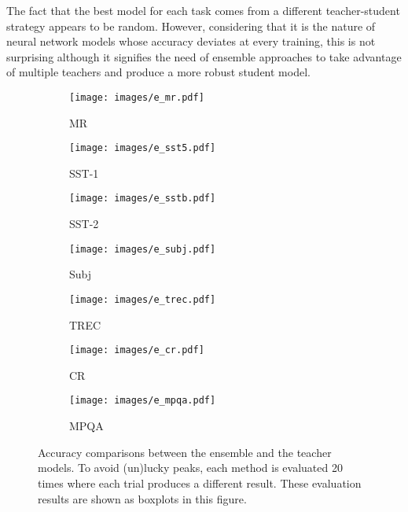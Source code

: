 \documentclass{article}
\begin{document}
The fact that the best model for each task comes from a different teacher-student strategy appears to be random.
However, considering that it is the nature of neural network models whose accuracy deviates at every training, this is not surprising although it signifies the need of ensemble approaches to take advantage of multiple teachers and produce a more robust student model.




































\begin{figure*}[htbp]
	\centering
	\begin{subfigure}[b]{0.14\textwidth}
		\centering
		\texttt{[image: images/e\_mr.pdf]}
		\caption{MR}
		\label{fig:ensemble.mr}
	\end{subfigure}\begin{subfigure}[b]{0.14\textwidth}
		\centering
		\texttt{[image: images/e\_sst5.pdf]}
		\caption{SST-1}
		\label{fig:ensemble.sst1}
	\end{subfigure}\begin{subfigure}[b]{0.14\textwidth}
		\centering
		\texttt{[image: images/e\_sstb.pdf]}
		\caption{SST-2}
		\label{fig:ensemble.sst2}
	\end{subfigure}\begin{subfigure}[b]{0.14\textwidth}
		\centering
		\texttt{[image: images/e\_subj.pdf]}
		\caption{Subj}
		\label{fig:ensemble.subj}
	\end{subfigure}\begin{subfigure}[b]{0.14\textwidth}
		\centering
		\texttt{[image: images/e\_trec.pdf]}
		\caption{TREC}
		\label{fig:ensemble.trec}
	\end{subfigure}\begin{subfigure}[b]{0.14\textwidth}
		\centering
		\texttt{[image: images/e\_cr.pdf]}
		\caption{CR}
		\label{fig:ensemble.cr}
	\end{subfigure}\begin{subfigure}[b]{0.14\textwidth}
		\centering
		\texttt{[image: images/e\_mpqa.pdf]}
		\caption{MPQA}
		\label{fig:ensemble.mpqa}
	\end{subfigure}\caption{Accuracy comparisons between the ensemble and the teacher models.
		To avoid (un)lucky peaks, each method is evaluated 20 times where each trial produces a different result.
		These evaluation results are shown as boxplots in this figure.}
	\label{fig:ensemble}
	\vspace{-2ex}
\end{figure*}
\end{document}
